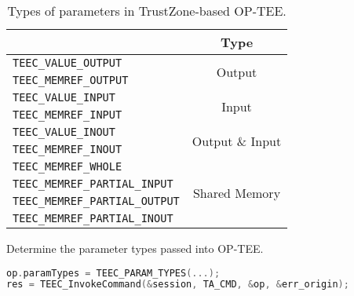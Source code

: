 \begin{table}[t]
    \caption{Types of parameters in TrustZone-based OP-TEE.}
    \label{tbl:type_name}
    \setlength{\tabcolsep}{5mm}
    \centering
	\begin{tabular}{lc}
		\toprule
		\makecell[c]{\textbf{Name}} & \textbf{Type} \\
		\midrule
            \texttt{TEEC\_VALUE\_OUTPUT} & \multirow{2}{*}{Output} \\
            \texttt{TEEC\_MEMREF\_OUTPUT} & \\
            \midrule
            \texttt{TEEC\_VALUE\_INPUT} & \multirow{2}{*}{Input} \\
            \texttt{TEEC\_MEMREF\_INPUT} & \\
            \midrule
            \texttt{TEEC\_VALUE\_INOUT} & \multirow{2}{*}{Output \& Input} \\
            \texttt{TEEC\_MEMREF\_INOUT} & \\
            \midrule
            \texttt{TEEC\_MEMREF\_WHOLE} & \multirow{4}{*}{Shared Memory} \\
            \texttt{TEEC\_MEMREF\_PARTIAL\_INPUT} & \\
            \texttt{TEEC\_MEMREF\_PARTIAL\_OUTPUT} & \\
            \texttt{TEEC\_MEMREF\_PARTIAL\_INOUT} & \\
		\bottomrule
	\end{tabular}
\end{table}

\begin{algorithm}[t]
\caption{Determine the parameter types passed into OP-TEE.}
\label{algo:param_type}
\end{algorithm}

\begin{lstlisting}[language=c++, aboveskip=10pt, belowskip=5pt]
op.paramTypes = TEEC_PARAM_TYPES(...);
res = TEEC_InvokeCommand(&session, TA_CMD, &op, &err_origin);
\end{lstlisting}

